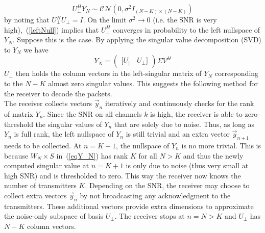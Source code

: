 \documentclass[10pt, a4paper, twocolumn]{IEEEtran}
\begin{document}
\begin{equation}
\label{leftNull}
U_{\bot}^H Y_N \sim \mathcal{CN}(0,\sigma^2 I_{(N-K)\times(N-K)})
\end{equation}
\noindent by noting that $U_{\bot}^H U_{\bot} = I$. On the limit $\sigma^2\rightarrow 0$ (i.e. the SNR is very high),~(\ref{leftNull}) implies that $U_{\bot}^H$ converges in probability to the left nullspace of $Y_N$. Suppose this is the case. By applying the singular value decomposition (SVD) to $Y_N$ we have
\begin{equation}
Y_N = \begin{pmatrix}[U_{\parallel} & U_{\bot}]\end{pmatrix}\Sigma V^H
\end{equation}
\noindent $U_{\bot}$ then holds the column vectors in the left-singular matrix of $Y_N$ corresponding to the $N-K$ almost zero singular values. This suggests the following method for the receiver to decode the packets.\\

\noindent The receiver collects vectors $\overrightarrow{y}_n$ iteratively and continuously checks for the rank of matrix $Y_n$. Since the SNR on all channels $k$ is high, the receiver is able to zero-threshold the singular values of $Y_n$ that are solely due to noise. Thus, as long as $Y_n$ is full rank, the left nullspace of $Y_n$ is still trivial and an extra vector $\overrightarrow{y}_{n+1}$ needs to be collected. At $n=K+1$, the nullspace of $Y_n$ is no more trivial. This is because $W_N\times S$ in~(\ref{eqY_N}) has rank $K$ for all $N>K$ and thus the newly computed singular value at $n=K+1$ is only due to noise (thus very small at high SNR) and is thresholded to zero. This way the receiver now knows the number of transmitters $K$. Depending on the SNR, the receiver may choose to collect extra vectors $\overrightarrow{y}_{n}$ by not broadcasting any acknowledgment to the transmitters. These additional vectors provide extra dimensions to approximate the noise-only subspace of basis $U_{\bot}$. The receiver stops at $n=N>K$ and $U_{\bot}$ has $N-K$ column vectors.\\
\end{document}
